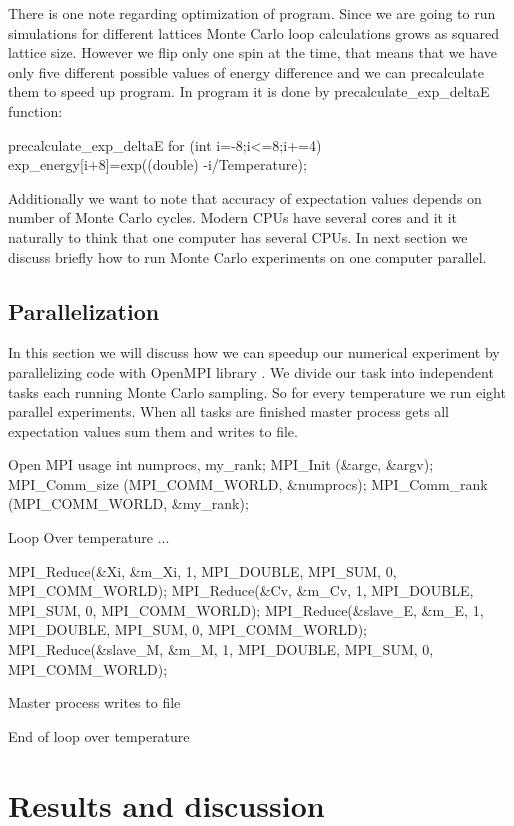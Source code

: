 \documentclass[10pt]{article}
\begin{document}
There is one note regarding optimization of program. Since we are going to run simulations for different lattices Monte Carlo loop calculations grows as squared lattice size. However we flip only one spin at the time, that means that we have only five different possible values of energy difference and we can precalculate them to speed up program. In program it is done by precalculate\_exp\_deltaE function:
\begin{pseudolisting}{precalculate\_exp\_deltaE}
for (int i=-8;i<=8;i+=4){
  exp_energy[i+8]=exp((double) -i/Temperature);
}

\end{pseudolisting}
Additionally we want to note that accuracy of expectation values depends on number of Monte Carlo cycles. Modern CPUs have several cores and it it naturally to think that one computer has several CPUs. In next section we discuss briefly how to run Monte Carlo experiments on one computer
parallel. 
\subsection{Parallelization}
In this section we will discuss how we can speedup our numerical experiment by parallelizing code with OpenMPI library \cite{Gabriel}. 
We divide our task into independent tasks each running Monte Carlo sampling. So for every temperature we run eight parallel experiments.
When all tasks are finished master process gets all expectation values sum them and writes to file.

\begin{pseudolisting}{Open MPI usage}
int numprocs, my_rank;
MPI_Init (&argc, &argv);
MPI_Comm_size (MPI_COMM_WORLD, &numprocs);
MPI_Comm_rank (MPI_COMM_WORLD, &my_rank);

Loop Over temperature {
    ...
  }

MPI_Reduce(&Xi, &m_Xi, 1, MPI_DOUBLE, 
          MPI_SUM, 0, MPI_COMM_WORLD);
MPI_Reduce(&Cv, &m_Cv, 1, MPI_DOUBLE, 
          MPI_SUM, 0, MPI_COMM_WORLD);
MPI_Reduce(&slave_E, &m_E, 1, MPI_DOUBLE, 
          MPI_SUM, 0, MPI_COMM_WORLD);
MPI_Reduce(&slave_M, &m_M, 1, MPI_DOUBLE, 
          MPI_SUM, 0, MPI_COMM_WORLD);

Master process writes to file

End of loop over temperature

\end{pseudolisting}




\section{Results and discussion}\label{results}
\end{document}
